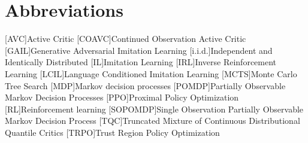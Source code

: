 
\chapter{Abbreviations}
\begin{acronym}
    [AVC]{Active Critic}
    [COAVC]{Continued Observation Active Critic}
    [GAIL]{Generative Adversarial Imitation Learning}
    [i.i.d.]{Independent and Identically Distributed}
    [IL]{Imitation Learning}
    [IRL]{Inverse Reinforcement Learning}
    [LCIL]{Language Conditioned Imitation Learning}
    [MCTS]{Monte Carlo Tree Search}
    [MDP]{Markov decision processes}
    [POMDP]{Partially Observable Markov Decision Processes}
    [PPO]{Proximal Policy Optimization}
    [RL]{Reinforcement learning}
    [SOPOMDP]{Single Observation Partially Observable Markov Decision Process}
    [TQC]{Truncated Mixture of Continuous Distributional Quantile Critics}
    [TRPO]{Trust Region Policy Optimization}
\end{acronym}

